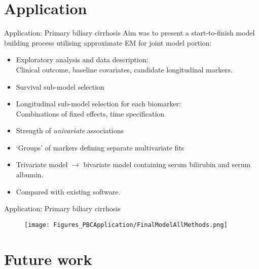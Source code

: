 \documentclass[10pt]{beamer}
\begin{document}
\section{Application}
\begin{frame}{Application: Primary biliary cirrhosis}
    Aim was to present a start-to-finish model building process utilising approximate EM for joint model portion:
    \vspace{1mm}
    \begin{itemize}
        \item Exploratory analysis and data description:\\
        Clinical outcome, baseline covariates, candidate longitudinal markers.
        \vspace{0.5mm}
        \item Survival sub-model selection 
        \vspace{0.5mm}
        \item Longitudinal sub-model selection for each biomarker:\\
        Combinations of fixed effects, time specification
        \vspace{0.5mm}
        \item Strength of \textit{univariate} associations
        \vspace{0.5mm}
        \item `Groups' of markers defining separate multivariate fits
        \vspace{0.5mm}
        \item Trivariate model $\rightarrow$ bivariate model containing serum bilirubin and serum albumin.
        \vspace{0.5mm}
        \item Compared with existing software.
    \end{itemize}
\end{frame}

\begin{frame}{Application: Primary biliary cirrhosis}
    \begin{figure}
        \centering
        \texttt{[image: Figures\_PBCApplication/FinalModelAllMethods.png]}
    \end{figure}
\end{frame}

\section{Future work}
\end{document}
